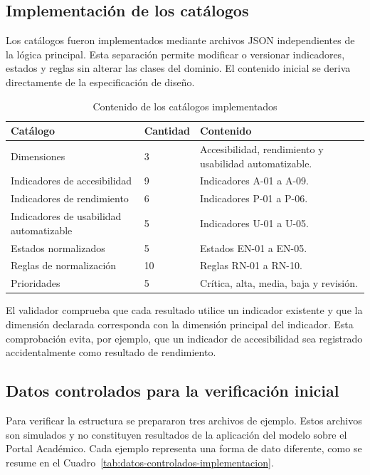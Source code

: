 \subsection{Implementación de los catálogos}

Los catálogos fueron implementados mediante archivos JSON independientes de la
lógica principal. Esta separación permite modificar o versionar indicadores,
estados y reglas sin alterar las clases del dominio. El contenido inicial se
deriva directamente de la especificación de diseño.

\begin{table}[H]
\centering
\caption{Contenido de los catálogos implementados}
\label{tab:catalogos-implementados}
\begin{tabularx}{\textwidth}{p{4.2cm}p{2.2cm}X}
\toprule
\textbf{Catálogo} & \textbf{Cantidad} & \textbf{Contenido}\\
\midrule
Dimensiones & 3 & Accesibilidad, rendimiento y usabilidad automatizable.\\
Indicadores de accesibilidad & 9 & Indicadores A-01 a A-09.\\
Indicadores de rendimiento & 6 & Indicadores P-01 a P-06.\\
Indicadores de usabilidad automatizable & 5 & Indicadores U-01 a U-05.\\
Estados normalizados & 5 & Estados EN-01 a EN-05.\\
Reglas de normalización & 10 & Reglas RN-01 a RN-10.\\
Prioridades & 5 & Crítica, alta, media, baja y revisión.\\
\bottomrule
\end{tabularx}
\end{table}

El validador comprueba que cada resultado utilice un indicador existente y que
la dimensión declarada corresponda con la dimensión principal del indicador.
Esta comprobación evita, por ejemplo, que un indicador de accesibilidad sea
registrado accidentalmente como resultado de rendimiento.

\subsection{Datos controlados para la verificación inicial}

Para verificar la estructura se prepararon tres archivos de ejemplo. Estos
archivos son simulados y no constituyen resultados de la aplicación del modelo
sobre el Portal Académico. Cada ejemplo representa una forma de dato diferente,
como se resume en el Cuadro~\ref{tab:datos-controlados-implementacion}.

